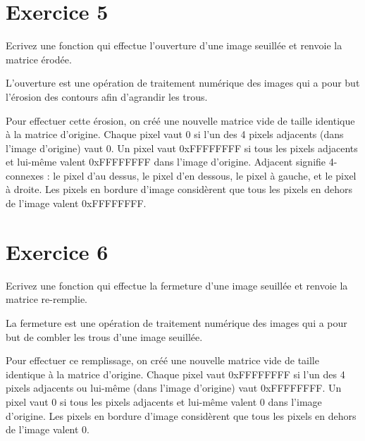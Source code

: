 \documentclass[10pt,twocolumn]{article}
\begin{document}
\section{Exercice 5}
Ecrivez une fonction qui effectue l'ouverture d'une image seuillée et renvoie la matrice érodée.
\par
L'ouverture est une opération de traitement numérique des images qui a pour but l'érosion des contours afin d'agrandir les trous.
\par
Pour effectuer cette érosion, on créé une nouvelle matrice vide de taille identique à la matrice d'origine. Chaque pixel vaut 0 si l'un des 4 pixels adjacents (dans l'image d'origine) vaut 0. Un pixel vaut 0xFFFFFFFF si tous les pixels adjacents et lui-même valent 0xFFFFFFFF dans l'image d'origine. Adjacent signifie 4-connexes : le pixel d'au dessus, le pixel d'en dessous, le pixel à gauche, et le pixel à droite.
Les pixels en bordure d'image considèrent que tous les pixels en dehors de l'image valent 0xFFFFFFFF.


\section{Exercice 6}
Ecrivez une fonction qui effectue la fermeture d'une image seuillée et renvoie la matrice re-remplie.
\par
La fermeture est une opération de traitement numérique des images qui a pour but de combler les trous d'une image seuillée.
\par
Pour effectuer ce remplissage, on créé une nouvelle matrice vide de taille identique à la matrice d'origine. Chaque pixel vaut 0xFFFFFFFF si l'un des 4 pixels adjacents  ou lui-même (dans l'image d'origine) vaut 0xFFFFFFFF. Un pixel vaut 0 si tous les pixels adjacents et lui-même valent 0 dans l'image d'origine.
Les pixels en bordure d'image considèrent que tous les pixels en dehors de l'image valent 0.
\end{document}
